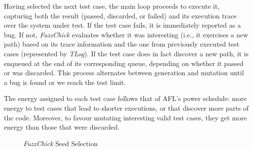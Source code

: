 \documentclass[acmsmall, anonymous]{acmart}
\newcommand{\fuzzchick}{\textit{FuzzChick}\xspace}
\begin{document}
Having selected the next test case, the main loop proceeds to execute it,
capturing both the result (passed, discarded, or failed) and its execution trace
over the system under test.
%
If the test case fails, it is immediately reported as a bug.
%
If not, \fuzzchick evaluates whether it was interesting (i.e., it exercises a
new path) based on its trace information and the one from previously executed
test cases (represented by \textit{TLog}).
%
If the test case does in fact discover a new path, it is enqueued at the end of
its corresponding queue, depending on whether it passed or was discarded.
%
This process alternates between generation and mutation until a bug is found or
we reach the test limit.


The energy assigned to each test case follows that of AFL's power schedule: more
energy to test cases that lead to shorter executions, or that discover more
parts of the code.
%
Moreover, to favour mutating interesting valid test cases, they get more energy
than those that were discarded.



\begin{figure}[t]
\begin{multicols}{2}

\begin{algorithm}[H]
  \SetInd{0em}{0.75em}
  \SetAlgoLined
  \DontPrintSemicolon
\caption{\label{algo:fuzzchick:loop}\fuzzchick Testing Loop}
\end{algorithm}

\columnbreak

\begin{algorithm}[H]
  \SetInd{0em}{0.75em}
  \SetAlgoLined
  \DontPrintSemicolon
\caption{\label{algo:fuzzchick:pick}\fuzzchick Seed Selection}
\end{algorithm}

\end{multicols}
\end{figure}
\end{document}
